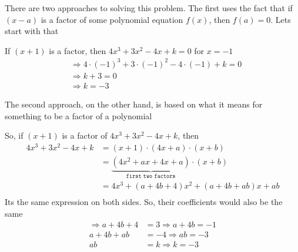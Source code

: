 \begin{solution}
	There are two approaches to solving this problem. The first uses the fact
	that if $(x-a)$ is a factor of some polynomial equation $f(x)$, then $f(a) = 0$.
	Lets start with that
	
	If $(x+1)$ is a factor, then $4x^3+3x^2-4x+k = 0 $ for $x = -1$
	\begin{align}
		& \Rightarrow 4\cdot(-1)^3+3\cdot(-1)^2-4\cdot(-1)+k = 0 \\
		& \Rightarrow k + 3 = 0 \\
		& \Rightarrow k = -3
	\end{align}
	
	The second approach, on the other hand, is based on what it means for something  
	to be a factor of a polynomial
	
	So, if $(x+1)$ is a factor of $4x^3+3x^2-4x+k$, then 
	\begin{align}
		4x^3+3x^2-4x+k &= (x+1)\cdot(4x+a)\cdot(x+b) \\
					   &= \underbrace{(4x^2+ax+4x+a)}_\texttt{first two factors}\cdot(x+b) \\
					   &= 4x^3+(a+4b+4)x^2+(a+4b+ab)x+ab \\
	\end{align}	 
	Its the same expression on both sides. So, their coefficients would also be the same
	\begin{align}
		\Rightarrow a+4b+4 &= 3 \Rightarrow a + 4b = -1\\
		            a+4b+ab &= -4 \Rightarrow ab = -3\\
		            ab &= k \Rightarrow k = -3
	\end{align}
	
\end{solution}
